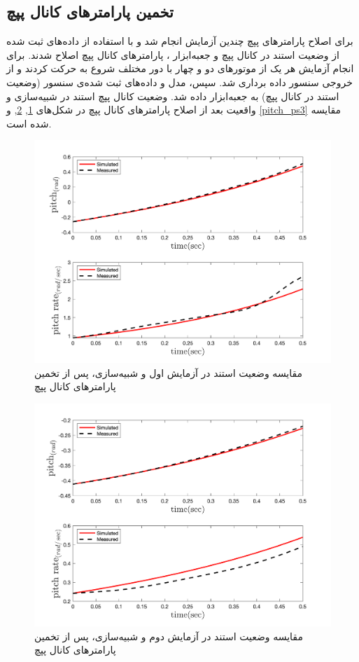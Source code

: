 \subsection{تخمین پارامترهای کانال پپچ}
برای اصلاح پارامترهای پپچ چندین آزمایش انجام شد و با استفاده از داده‌های ثبت شده از وضعیت استند در کانال پپچ و جعبه‌ابزار
،
پارامترهای کانال پپچ اصلاح شدند.
برای انجام آزمایش هر یک از موتورهای دو و چهار  با دور مختلف شروع به حرکت کردند و از خروجی سنسور داده برداری شد. سپس، مدل و داده‌های ثبت شده‌ی سنسور (وضعیت استند در کانال پپچ) به جعبه‌ابزار
داده شد. وضعیت کانال پپچ استند در شبیه‌سازی و واقعیت بعد از اصلاح پارامترهای کانال پپچ در شکل‌های
\ref{pitch_ps1}, \ref{pitch_ps2}, و \ref{pitch_ps3}
مقایسه شده است.

\begin{figure}[H]
	\includegraphics[width=12cm]{../Figures/RCP/pitch_parameter_estimation/RCP_pitch_S1.png}
	\centering
	\caption{مقايسه وضعیت استند در  آزمايش اول و شبیه‌سازی، پس از تخمین پارامترهای کانال پپچ}
	\label{pitch_ps1}
\end{figure}
\begin{figure}[H]
	\includegraphics[width=12cm]{../Figures/RCP/pitch_parameter_estimation/RCP_pitch_S2.png}
	\centering
	\caption{مقايسه وضعیت استند در  آزمايش دوم و شبیه‌سازی، پس از تخمین پارامترهای کانال پپچ}
	\label{pitch_ps2}
\end{figure}
